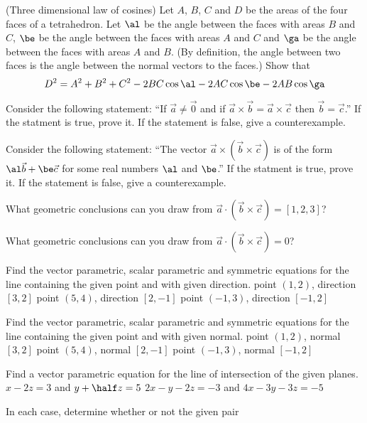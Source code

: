 {\centerline{}
\medskip
\item{\next} (Three dimensional law of cosines)  Let $A$, $B$, $C$ and
$D$ be the areas of the four faces of a tetrahedron. Let $\al$ be the angle
between the faces with areas $B$ and $C$, $\be$ be the angle
between the faces with areas $A$ and $C$ and $\ga$ be the angle
between the faces with areas $A$ and $B$. (By definition, the angle between
two faces is the angle between the normal vectors to the faces.)
 Show that 
$$
D^2=A^2+B^2+C^2-2BC\cos\al-2AC\cos\be-2AB\cos\ga
$$
\medskip
\item{\next} Consider the following statement: ``If $\vec a\ne\vec 0$
and if $\vec a\times\vec b=\vec a\times\vec c$ then $\vec b=\vec c$.''
If the statment is true, prove it. If the statement is false, give a 
counterexample.
\medskip
\edef\Qnine{\number\counter}
\item{\next} Consider the following statement: ``The vector $\vec a\times(\vec
b\times\vec c)$ is of the form $\al\vec b+\be\vec c$ for some real numbers
$\al$ and $\be$.''
If the statment is true, prove it. If the statement is false, give a 
counterexample.
\medskip
\item{\next} What geometric conclusions can you draw from
$\vec a\cdot(\vec b\times\vec c)=[1,2,3]$?
\medskip
\item{\next} What geometric conclusions can you draw from
$\vec a\cdot(\vec b\times\vec c)=0$?
\medskip
\item{\next} Find the vector parametric, scalar parametric
 and symmetric equations for the line
containing the given point and with given direction.
 point $(1,2)$, direction $[3,2]$
 point $(5,4)$, direction $[2,-1]$
 point $(-1,3)$, direction $[-1,2]$
\medskip
\item{\next} Find the vector parametric, scalar parametric
 and symmetric equations for the line
containing the given point and with given normal.
 point $(1,2)$, normal $[3,2]$
 point $(5,4)$, normal $[2,-1]$
 point $(-1,3)$, normal $[-1,2]$
\medskip
\item{\next} Find a vector parametric equation for the line of intersection
of the given planes.
 $x-2z=3$ and $y+\half z=5$
 $2x-y-2z=-3$ and $4x-3y-3 z=-5$
\medskip
\item{\next} In each case, determine whether or not the given pair
}
